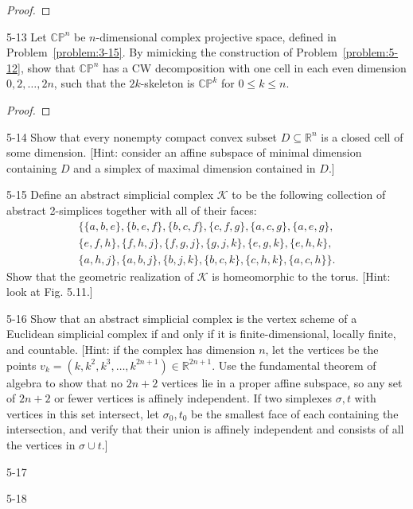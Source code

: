 \begin{proof}
\end{proof}

\begin{problem}{5-13}\label{problem:5-13}
Let \( \mathbb{CP}^{n} \) be \( n \)-dimensional complex projective space, defined in Problem~\ref{problem:3-15}. By mimicking the construction of Problem~\ref{problem:5-12}, show that \( \mathbb{CP}^{n} \) has a CW decomposition with one cell in each even dimension \( 0, 2, \dots, 2n \), such that the \( 2k \)-skeleton is \( \mathbb{CP}^{k} \) for \( 0 \le k \le n \).
\end{problem}

\begin{proof}
\end{proof}

\begin{problem}{5-14}\label{problem:5-14}
Show that every nonempty compact convex subset \( D \subseteq \mathbb{R}^{n} \) is a closed cell of some dimension. [Hint: consider an affine subspace of minimal dimension containing \( D \) and a simplex of maximal dimension contained in \( D \).]
\end{problem}

\begin{problem}{5-15}\label{problem:5-15}
Define an abstract simplicial complex \( \mathcal{K} \) to be the following collection of abstract 2-simplices together with all of their faces:
\begin{multline*}
	\{ \{a, b, e\}, \{b, e, f\}, \{b, c, f\}, \{c, f, g\}, \{a, c, g\}, \{a, e, g\}, \\
	\{e, f, h\}, \{f, h, j\}, \{f, g, j\}, \{g, j, k\}, \{e, g, k\}, \{e, h, k\}, \\
	\{a, h, j\}, \{a, b, j\}, \{b, j, k\}, \{b, c, k\}, \{c, h, k\}, \{a, c, h\} \}.
\end{multline*}
Show that the geometric realization of \( \mathcal{K} \) is homeomorphic to the torus. [Hint: look at Fig. 5.11.]
\end{problem}

\begin{problem}{5-16}\label{problem:5-16}
Show that an abstract simplicial complex is the vertex scheme of a Euclidean simplicial complex if and only if it is finite-dimensional, locally finite, and countable. [Hint: if the complex has dimension \(n\), let the vertices be the points \( v_k = (k, k^2, k^3, \dots, k^{2n+1}) \in \mathbb{R}^{2n+1} \). Use the fundamental theorem of algebra to show that no \( 2n+2 \) vertices lie in a proper affine subspace, so any set of \( 2n+2 \) or fewer vertices is affinely independent. If two simplexes \( \sigma, t \) with vertices in this set intersect, let \( \sigma_{0}, t_{0} \) be the smallest face of each containing the intersection, and verify that their union is affinely independent and consists of all the vertices in \( \sigma \cup t \).]
\end{problem}

\begin{problem}{5-17}\label{problem:5-17}
\end{problem}

\begin{problem}{5-18}\label{problem:5-18}
\end{problem}

